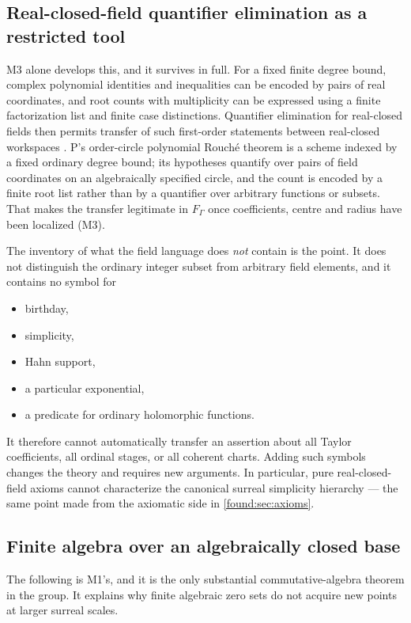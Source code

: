 \documentclass[11pt,letterpaper]{article}
\numberwithin{equation}{section}
\theoremstyle{definition}
\theoremstyle{remark}
\begin{document}
\subsection{Real-closed-field quantifier elimination as a restricted tool}
\label{found:sub:qe}
M3 alone develops this, and it survives in full. For a fixed finite degree
bound, complex polynomial identities and inequalities can be encoded by pairs of
real coordinates, and root counts with multiplicity can be expressed using a
finite factorization list and finite case distinctions. Quantifier elimination
for real-closed fields then permits transfer of such first-order statements
between real-closed workspaces \cite{found:Tarski}. P's order-circle polynomial
Rouch\'e theorem is a scheme indexed by a fixed ordinary degree bound; its
hypotheses quantify over pairs of field coordinates on an algebraically
specified circle, and the count is encoded by a finite root list rather than by
a quantifier over arbitrary functions or subsets. That makes the transfer
legitimate in $F_\Gamma$ once coefficients, centre and radius have been
localized (M3).

The inventory of what the field language does \emph{not} contain is the point.
It does not distinguish the ordinary integer subset from arbitrary field
elements, and it contains no symbol for
\begin{itemize}
\item birthday, \item simplicity, \item Hahn support,
\item a particular exponential, \item a predicate for ordinary holomorphic
functions.
\end{itemize}
It therefore cannot automatically transfer an assertion about all Taylor
coefficients, all ordinal stages, or all coherent charts. Adding such symbols
changes the theory and requires new arguments. In particular, pure
real-closed-field axioms cannot characterize the canonical surreal simplicity
hierarchy --- the same point made from the axiomatic side in
\cref{found:sec:axioms}.

\subsection{Finite algebra over an algebraically closed base}
\label{found:sub:finitealgebra}
The following is M1's, and it is the only substantial commutative-algebra
theorem in the group. It explains why finite algebraic zero sets do not acquire
new points at larger surreal scales.
\end{document}
